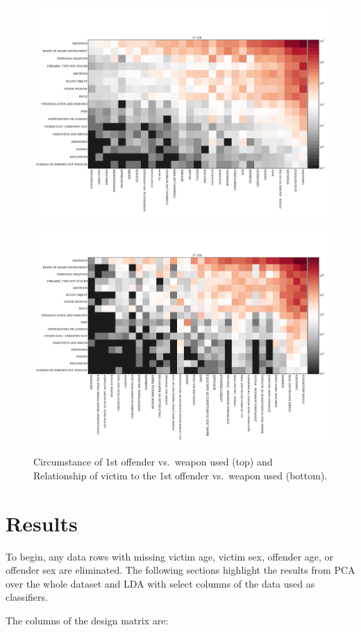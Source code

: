 \documentclass{evanarticle}
\begin{document}
\begin{figure}
  \centering
    \includegraphics[width=0.8\linewidth]{images/all_data_relation.pdf}
    \includegraphics[width=0.8\linewidth]{images/all_data_circum.pdf}
  \caption{Circumstance of 1st offender vs.~weapon used (top) and Relationship of victim to the 1st offender vs.~weapon used (bottom).}
\end{figure}

\section{Results} \label{sec_results}

To begin, any data rows with missing victim age, victim sex, offender age, or offender sex are eliminated.
The following sections highlight the results from PCA over the whole dataset and LDA with select columns of the data used as classifiers.

The columns of the design matrix are:
\end{document}
